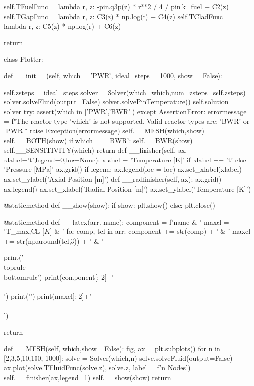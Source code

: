 \documentclass{article}
\begin{document}
\begin{python}
        self.TFuelFunc = lambda r, z: -pin.q3p(z) * r**2 / 4 / pin.k_fuel + C2(z)
        self.TGapFunc = lambda r, z: C3(z) * np.log(r) + C4(z)
        self.TCladFunc = lambda r, z: C5(z) * np.log(r) + C6(z)
        
        return
        

class Plotter:
    
    def __init__(self, which = 'PWR', ideal_steps = 1000, show = False):

        self.zsteps = ideal_steps
        solver = Solver(which=which,num_zsteps=self.zsteps)
        solver.solveFluid(output=False)
        solver.solvePinTemperature()
        self.solution = solver
        try:
            assert(which in ['PWR','BWR'])
        except AssertionError:
            errormessage = f"The reactor type '{which}' is not supported. Valid reactor types are: 'BWR' or 'PWR'"
            raise Exception(errormessage)
        self.__MESH(which,show)
        self.__BOTH(show)
        if which == 'BWR':
            self.__BWR(show)
        self.__SENSITIVITY(which)
        return
    def __finisher(self, ax, xlabel='t',legend=0,loc=None):
        xlabel = 'Temperature  [K]' if xlabel == 't' else 'Pressure  [MPa]'
        ax.grid()
        if legend:
            ax.legend(loc = loc)
        ax.set_xlabel(xlabel)
        ax.set_ylabel('Axial Position  [m]')
    def __radfinisher(self, ax):
        ax.grid()
        ax.legend()
        ax.set_xlabel('Radial Position  [m]')
        ax.set_ylabel('Temperature  [K]')

    @staticmethod
    def __show(show):
        if show:
            plt.show()
        else:
            plt.close()
        
    @staticmethod   
    def __latex(arr, name):
        component = f'{name} & '
        maxcl = 'T_{max,CL}  [$K$] & '
        for comp, tcl in arr:
            component += str(comp) + ' & '
            maxcl += str(np.around(tcl,3)) + ' & '

        print('\\toprule\n\\bottomrule')
        print(component[:-2]+'\\\\')
        print('\hline')
        print(maxcl[:-2]+'\\\\')
        
        return


    def __MESH(self, which,show =False):
        fig, ax = plt.subplots()
        for n in [2,3,5,10,100, 1000]:
            solve = Solver(which,n)
            solve.solveFluid(output=False)
            ax.plot(solve.TFluidFunc(solve.z), solve.z, label = f'{n} Nodes')
        self.__finisher(ax,legend=1)
        self.__show(show)
        return


\end{python}
\end{document}
